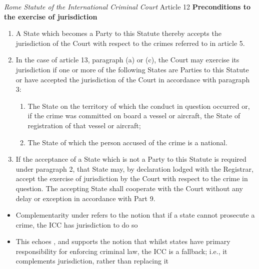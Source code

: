 \begin{statutedetails}{\textit{Rome Statute of the International Criminal Court} Article 12}
    \flushleft
    \textbf{Preconditions to the exercise of jurisdiction}
    \begin{enumerate}
        \item A State which becomes a Party to this Statute thereby accepts the jurisdiction of the Court with respect to the crimes referred to in article 5. 
        \item In the case of article 13, paragraph (a) or (c), the Court may exercise its jurisdiction if one or more of the following States are Parties to this Statute or have accepted the jurisdiction of the Court in accordance with paragraph 3: 
        \begin{enumerate}[label=(\alph*)]
            \item The State on the territory of which the conduct in question occurred or, if the crime was committed on board a vessel or aircraft, the State of registration of that vessel or aircraft; 
            \item The State of which the person accused of the crime is a national.
        \end{enumerate}
        \item If the acceptance of a State which is not a Party to this Statute is required under paragraph 2, that State may, by declaration lodged with the Registrar, accept the exercise of jurisdiction by the Court with respect to the crime in question. The accepting State shall cooperate with the Court without any delay or exception in accordance with Part 9.
    \end{enumerate}
\end{statutedetails}

\begin{itemize}
    \item Complementarity under  refers to the notion that if a state cannot prosecute a crime, the ICC has jurisdiction to do so
    \item This echoes , and supports the notion that whilst states have primary responsibility for enforcing criminal law, the ICC is a fallback; i.e., it complements jurisdiction, rather than replacing it
\end{itemize}


